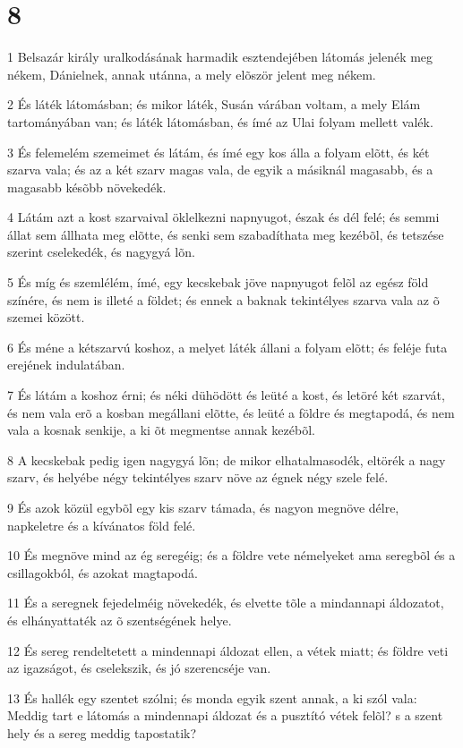 \chapter{8}

\par 1 Belsazár király uralkodásának harmadik esztendejében látomás jelenék meg nékem, Dánielnek, annak utánna, a mely elõször jelent meg nékem.
\par 2 És láték látomásban; és mikor láték, Susán várában voltam, a mely Elám  tartományában van; és láték látomásban, és ímé az Ulai folyam mellett valék.
\par 3 És felemelém szemeimet és látám, és ímé egy kos álla a folyam elõtt, és két szarva vala; és az a két szarv magas vala, de egyik a másiknál magasabb, és a magasabb késõbb növekedék.
\par 4 Látám azt a kost szarvaival öklelkezni napnyugot, észak és dél felé; és semmi állat sem állhata meg elõtte, és senki sem szabadíthata meg kezébõl, és tetszése szerint cselekedék, és nagygyá lõn.
\par 5 És míg és szemlélém, ímé, egy kecskebak jöve napnyugot felõl az egész föld színére, és nem is illeté a földet; és ennek a baknak tekintélyes szarva vala az õ szemei között.
\par 6 És méne a kétszarvú koshoz, a melyet láték állani a folyam elõtt; és feléje futa erejének indulatában.
\par 7 És látám a koshoz érni; és néki dühödött és leüté a kost, és letöré két szarvát, és nem vala erõ a kosban megállani elõtte, és leüté a földre és megtapodá, és nem vala a kosnak senkije, a ki õt megmentse annak kezébõl.
\par 8 A kecskebak pedig igen nagygyá lõn; de mikor elhatalmasodék, eltörék a nagy szarv, és helyébe négy tekintélyes szarv növe az égnek négy szele felé.
\par 9 És azok közül egybõl egy kis szarv támada, és nagyon megnöve délre, napkeletre és a kívánatos föld felé.
\par 10 És megnöve mind az ég seregéig; és a földre vete némelyeket ama seregbõl és a csillagokból, és azokat magtapodá.
\par 11 És a seregnek fejedelméig növekedék, és elvette tõle a mindannapi áldozatot, és elhányattaték az õ szentségének helye.
\par 12 És sereg rendeltetett a mindennapi áldozat ellen, a vétek miatt; és földre veti az igazságot, és cselekszik, és jó szerencséje van.
\par 13 És hallék egy szentet szólni; és monda egyik szent annak, a ki szól vala: Meddig tart e látomás a mindennapi áldozat és a pusztító vétek felõl? s a szent hely és a sereg meddig tapostatik?
